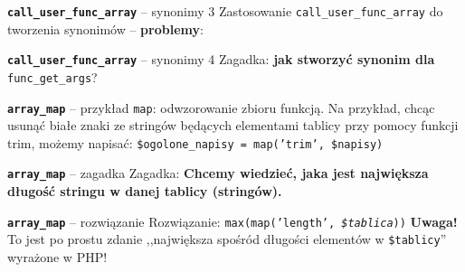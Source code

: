 \documentclass{beamer}
\begin{document}
\begin{frame}{\textbf{\texttt{call\_user\_func\_array}} -- synonimy 3}
  Zastosowanie \texttt{call\_user\_func\_array} do tworzenia synonimów -- 
\textbf{problemy}: \pause
\end{frame}


\begin{frame}{\textbf{\texttt{call\_user\_func\_array}} -- synonimy 4}
  Zagadka: \textbf{jak stworzyć synonim dla} \texttt{func\_get\_args}?
\end{frame}


\begin{frame}{\textbf{\texttt{array\_map}} -- przykład}
\texttt{map}: odwzorowanie zbioru funkcją. \pause Na przykład, chcąc 
usunąć białe znaki ze stringów będących elementami tablicy przy pomocy
funkcji trim, możemy napisać: \newline \newline
\texttt{\$ogolone\_napisy = map('trim', \$napisy)}
\end{frame}

\begin{frame}{\textbf{\texttt{array\_map}} -- zagadka}
Zagadka: \textbf{Chcemy wiedzieć, jaka jest największa długość
stringu w danej tablicy (stringów).}
\end{frame}

\begin{frame}{\textbf{\texttt{array\_map}} -- rozwiązanie}
Rozwiązanie: \texttt{max(map('length', \emph{\$tablica}))}
\newline \newline \pause
\textbf{Uwaga!} To jest po prostu zdanie ,,największa spośród długości
elementów w \texttt{\$tablicy}'' wyrażone w PHP!
\end{frame}
\end{document}
